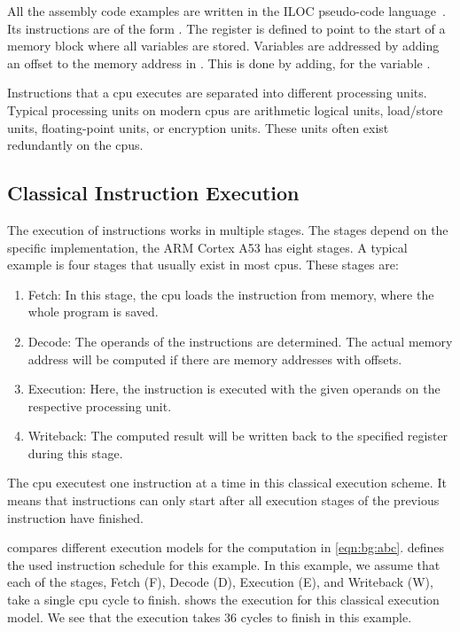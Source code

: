 All the assembly code examples are written in the ILOC pseudo-code language~\cite{engineeringcompiler2007}.
Its instructions are of the form .
The register  is defined to point to the start of a memory block where all variables are stored.
Variables are addressed by adding an offset to the memory address in .
This is done by adding, \eg {} for the variable .

Instructions that a \ac{cpu} executes are separated into different processing units.
Typical processing units on modern \acp{cpu} are arithmetic logical units, load/store units, floating-point units, or encryption units.
These units often exist redundantly on the \acp{cpu}.

\subsection{Classical Instruction Execution}
The execution of instructions works in multiple stages.
The stages depend on the specific implementation, \eg the ARM Cortex A53 has eight stages.
A typical example is four stages that usually exist in most \acp{cpu}.
These stages are:
\begin{enumerate}
    \item Fetch: 
        In this stage, the \ac{cpu} loads the instruction from memory, where the whole program is saved. 
    \item Decode:
        The operands of the instructions are determined.
        The actual memory address will be computed if there are memory addresses with offsets.
    \item Execution:
        Here, the instruction is executed with the given operands on the respective processing unit.
    \item Writeback:
        The computed result will be written back to the specified register during this stage.
\end{enumerate}

The \ac{cpu} executest one instruction at a time in this classical execution scheme.
It means that instructions can only start after all execution stages of the previous instruction have finished.

 compares different execution models for the computation in \cref{eqn:bg:abc}.
 defines the used instruction schedule for this example.
In this example, we assume that each of the stages, Fetch (F), Decode (D), Execution (E), and Writeback (W), take a single \ac{cpu} cycle to finish.
 shows the execution for this classical execution model.
We see that the execution takes 36 cycles to finish in this example.

